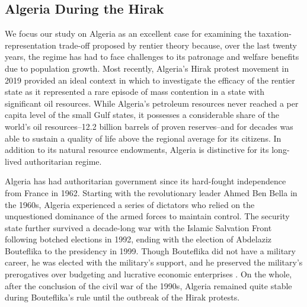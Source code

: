 \documentclass[12pt, letterpaper]{article}
\begin{document}

\subsection*{Algeria During the Hirak}

We focus our study on Algeria as an excellent case for examining the taxation-representation trade-off proposed by rentier theory because, over the last twenty years, the regime has had to face challenges to its patronage and welfare benefits due to population growth. Most recently, Algeria's Hirak protest movement in 2019 provided an ideal context in which to investigate the efficacy of the rentier state as it represented a rare episode of mass contention in a state with significant oil resources. While Algeria's petroleum resources never reached a per capita level of the small Gulf states, it possesses a considerable share of the world's oil resources--12.2 billion barrels of proven reserves--and for decades was able to sustain a quality of life above the regional average for its citizens. In addition to its natural resource endowments, Algeria is distinctive for its long-lived authoritarian regime.

Algeria has had authoritarian government since its hard-fought independence from France in 1962. Starting with the revolutionary leader Ahmed Ben Bella in the 1960s, Algeria experienced a series of dictators who relied on the unquestioned dominance of the armed forces to maintain control. The security state further survived a decade-long war with the Islamic Salvation Front following botched elections in 1992, ending with the election of Abdelaziz Bouteflika to the presidency in 1999. Though Bouteflika did not have a military career, he was elected with the military's support, and he preserved the military's prerogatives over budgeting and lucrative economic enterprises \parencite{dillman_state_2000}. On the whole, after the conclusion of the civil war of the 1990s, Algeria remained quite stable during Bouteflika's rule  until the outbreak of the Hirak protests. 
\end{document}
